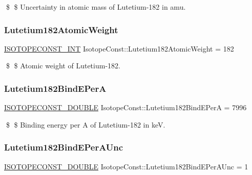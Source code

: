 \$ \$ Uncertainty in atomic mass of Lutetium-\/182 in amu. \mbox{\label{group___isotope_const-_lutetium-_lu182_ga5676915ecb6afaa303cb36b2278cef2d}} 
\subsubsection{\texorpdfstring{Lutetium182\+Atomic\+Weight}{Lutetium182AtomicWeight}}
{\footnotesize\ttfamily \mbox{\hyperlink{group___isotope_const-_macros_ga5f18360b3e99483a35c32d789e62621c}{I\+S\+O\+T\+O\+P\+E\+C\+O\+N\+S\+T\+\_\+\+I\+NT}} Isotope\+Const\+::\+Lutetium182\+Atomic\+Weight = 182}

\$ \$ Atomic weight of Lutetium-\/182. \mbox{\label{group___isotope_const-_lutetium-_lu182_gacb8ec1c44f38d731ca319fbc86f48e01}} 
\subsubsection{\texorpdfstring{Lutetium182\+Bind\+E\+PerA}{Lutetium182BindEPerA}}
{\footnotesize\ttfamily \mbox{\hyperlink{group___isotope_const-_macros_ga8f45a7272ce02c0b4c65c44636ed719a}{I\+S\+O\+T\+O\+P\+E\+C\+O\+N\+S\+T\+\_\+\+D\+O\+U\+B\+LE}} Isotope\+Const\+::\+Lutetium182\+Bind\+E\+PerA = 7996}

\$ \$ Binding energy per A of Lutetium-\/182 in keV. \mbox{\label{group___isotope_const-_lutetium-_lu182_ga3c99f193ae0648a4f0218df62b60a711}} 
\subsubsection{\texorpdfstring{Lutetium182\+Bind\+E\+Per\+A\+Unc}{Lutetium182BindEPerAUnc}}
{\footnotesize\ttfamily \mbox{\hyperlink{group___isotope_const-_macros_ga8f45a7272ce02c0b4c65c44636ed719a}{I\+S\+O\+T\+O\+P\+E\+C\+O\+N\+S\+T\+\_\+\+D\+O\+U\+B\+LE}} Isotope\+Const\+::\+Lutetium182\+Bind\+E\+Per\+A\+Unc = 1}

